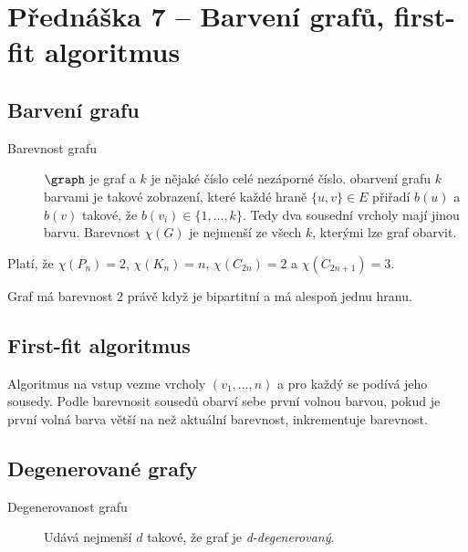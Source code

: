 \section{Přednáška 7 -- Barvení grafů, first-fit algoritmus}

\subsection{Barvení grafu}

\begin{description}
    \item[Barevnost grafu] $\graph$ je graf a $k$ je nějaké číslo celé nezáporné číslo.
    obarvení grafu $k$ barvami je takové zobrazení, které každé hraně $\{u, v\} \in E$ přiřadí $b(u)$ a $b(v)$ takové, že $b(v_i) \in \{1, \dots, k\}$.
    Tedy dva sousední vrcholy mají jinou barvu.
    Barevnost $\chi(G)$ je nejmenší ze všech $k$, kterými lze graf obarvit.
\end{description}

Platí, že $\chi(P_n) = 2$, $\chi(K_n) = n$, $\chi(C_{2n}) = 2$ a $\chi(C_{2n+1}) = 3$.

Graf má barevnost 2 právě když je bipartitní a má alespoň jednu hranu.

\subsection{First-fit algoritmus}\label{alg:first-fit}

Algoritmus na vstup vezme vrcholy $(v_1, \ldots, n)$ a pro každý se podívá jeho sousedy.
Podle barevnosit sousedů obarví sebe první volnou barvou, pokud je první volná barva větší na než aktuální barevnost, inkrementuje barevnost.

\subsection{Degenerované grafy}


\begin{description}
    \item[Degenerovanost grafu] Udává nejmenší $d$ takové, že graf je \textit{d-degenerovaný}.
\end{description}


